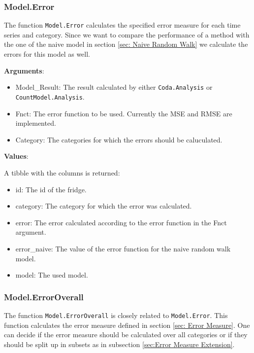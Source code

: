 \subsubsection{Model.Error}
\label{sec:Model.Error}

The function \texttt{Model.Error} calculates the specified error measure for each time series and category. Since we want to compare the performance of a method with the one of the naive model in section \ref{sec: Naive Random Walk} we calculate the errors for this model as well. 

\textbf{Arguments}:

\begin{itemize}
	\item Model\_Result: The result calculated by either \texttt{Coda.Analysis} or \texttt{CountModel.Analysis}.
	\item Fnct: The error function to be used. Currently the MSE and RMSE are implemented. 
	\item Category: The categories for which the errors should be caluculated.
\end{itemize}

\textbf{Values}:

A tibble with the columns is returned: 

\begin{itemize}
	\item id: The id of the fridge.
	\item category: The category for which the error was calculated. 
	\item error: The error calculated according to the error function in the Fnct argument. 
	\item error\_naive: The value of the error function for the naive random walk model.
	\item model: The used model.  
\end{itemize}

\subsubsection{Model.ErrorOverall}
\label{sec:Model.ErrorOverall}

The function \texttt{Model.ErrorOverall} is closely related to \texttt{Model.Error}. This function calculates the error measure defined in section \ref{sec: Error Measure}. One can decide if the error measure should be calculated over all categories or if they should be split up in subsets as in subsection \ref{sec:Error Measure Extension}.

